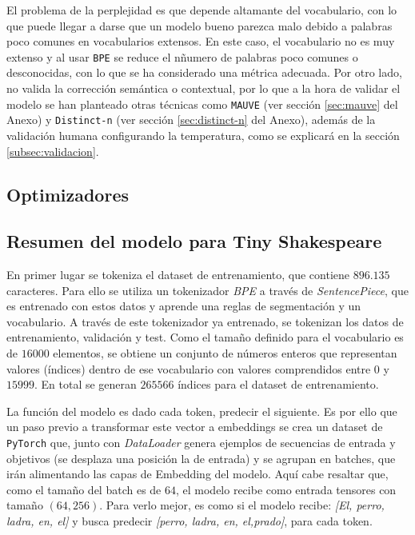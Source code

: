 \documentclass[11pt]{book}
\theoremstyle{plain}
\theoremstyle{definition}
\begin{document}
El problema de la perplejidad \parencite{singh2024perplexitymatters} es que depende altamante del vocabulario, con lo que puede llegar a darse que un modelo bueno parezca malo debido a palabras poco comunes en vocabularios extensos. En este caso, el vocabulario no es muy extenso y al usar \texttt{BPE} se reduce el nñumero de palabras poco comunes o desconocidas, con lo que se ha considerado una métrica adecuada. Por otro lado, no valida la corrección semántica o contextual, por lo que a la hora de validar el modelo se han planteado otras técnicas como \texttt{MAUVE} \parencite{krishnap25_mauve_github} (ver sección \ref{sec:mauve} del Anexo) y \texttt{Distinct-n} (ver sección \ref{sec:distinct-n} del Anexo), además de la validación humana configurando la temperatura, como se explicará en la sección \ref{subsec:validacion}.


\subsection{Optimizadores}


\subsection{Resumen del modelo para Tiny Shakespeare}

En primer lugar se tokeniza el dataset de entrenamiento, que contiene $896.135$ caracteres. Para ello se utiliza un tokenizador \textit{BPE} a través de \textit{SentencePiece}, que es entrenado con estos datos y aprende una reglas de segmentación y un vocabulario. A través de este tokenizador ya entrenado, se tokenizan los datos de entrenamiento, validación y test. Como el tamaño definido para el vocabulario es de $16000$ elementos, se obtiene un conjunto de números enteros que representan valores (índices) dentro de ese vocabulario con valores comprendidos entre $0$ y $15999$. En total se generan $265566$ índices para el dataset de entrenamiento. 

La función del modelo es dado cada token, predecir el siguiente. Es por ello que un paso previo a transformar este vector a embeddings se crea un dataset de \texttt{PyTorch} que, junto con \textit{DataLoader} genera ejemplos de secuencias de entrada y objetivos (se desplaza una posición la de entrada) y se agrupan en batches, que irán alimentando las capas de Embedding del modelo. Aquí cabe resaltar que, como el tamaño del batch es de $64$, el modelo recibe como entrada tensores con tamaño $(64,256)$. Para verlo mejor, es como si el modelo recibe: \textit{[El, perro, ladra, en, el]} y busca predecir \textit{[perro, ladra, en, el,prado]}, para cada token.
\end{document}
